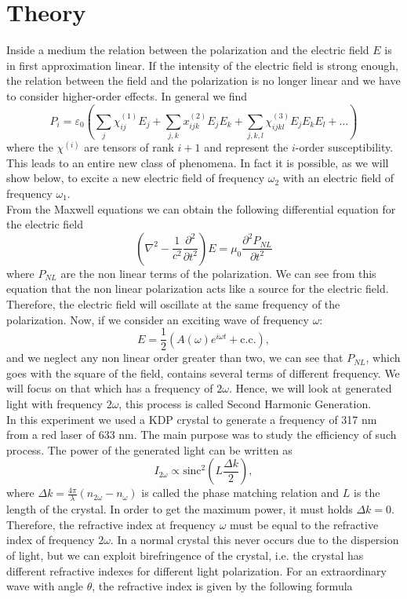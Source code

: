 \documentclass[a4paper,10pt]{article}
\begin{document}
\section{Theory}
Inside a medium the relation between the polarization and the electric field $E$ is in first approximation linear. If the intensity of the electric field is strong enough, the relation between the field and the polarization is no longer linear and we have to consider higher-order effects. In general we find
\begin{equation}P_i  = \varepsilon_0\left(\sum_j \chi_{ij}^{(1)} E_j + \sum_{j,k}x_{ijk}^{(2)}E_jE_k + \sum_{j,k,l}\chi_{ijkl}^{(3)}E_jE_kE_l + \dots \right)\end{equation}
where the $\chi^{(i)}$ are tensors of rank $i+1$ and represent the $i$-order susceptibility. This leads to an entire new class of phenomena. In fact it is possible, as we will show below, to excite a new electric field of frequency $\omega_2$ with an electric field of frequency $\omega_1$.\\
From the Maxwell equations we can obtain \cite{saleh} the following differential equation for the electric field
\begin{equation}\left(\nabla^2 - \frac{1}{c^2}\frac{\partial^2}{\partial t^2}\right)E = \mu_0\frac{\partial^2 P_{NL}}{\partial t^2}\end{equation}
where $P_{NL}$ are the non linear terms of the polarization. We can see from this equation that the non linear polarization acts like a source for the electric field. Therefore, the electric field will oscillate at the same frequency of the polarization. Now, if we consider an exciting wave of frequency $\omega$:
\[E = \frac{1}{2}(A(\omega)e^{i\omega t} + \text{c.c.}), \]
and we neglect any non linear order greater than two, we can see that $P_{NL}$, which goes with the square of the field, contains several terms of different frequency. We will focus on that which has a frequency of $2\omega$. Hence, we will look at generated light with frequency $2\omega$, this process is called Second Harmonic Generation.\\
In this experiment we used a KDP crystal to generate a frequency of 317 nm from a red laser of 633 nm. The main purpose was to study the efficiency of such process. The power of the generated light can be written \cite{saleh} as
\[I_{2\omega} \propto \text{sinc}^2\left(L\frac{\Delta k}{2 }\right),\]
where $\Delta k = \frac{4\pi}{\lambda}(n_{2\omega} - n_\omega)$ is called the phase matching relation and $L$ is the length of the crystal. In order to get the maximum power, it must holds $\Delta k = 0$. Therefore, the refractive index at frequency $\omega$ must be equal to the refractive index of frequency $2\omega$. In a normal crystal this never occurs due to the dispersion of light, but we can exploit birefringence of the crystal, i.e. the crystal has different refractive indexes for different light polarization. For an extraordinary wave with angle $\theta$, the refractive index is given by the following formula \cite{saleh}
\end{document}
